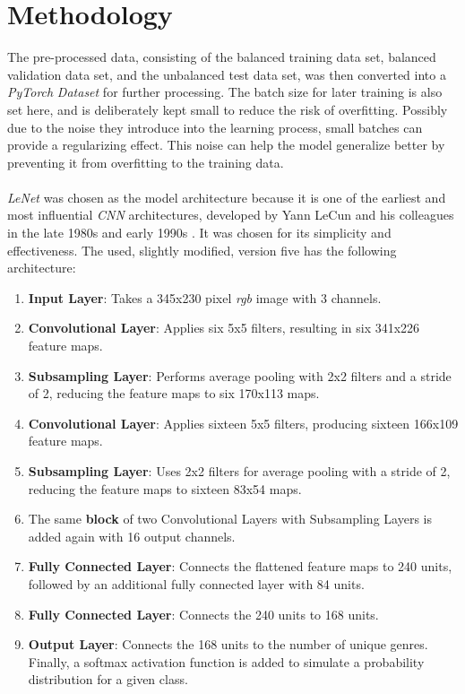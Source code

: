 \documentclass[a4paper, 11pt]{article}
\begin{document}
\section{Methodology}
    The pre-processed data, consisting of the balanced training data set, balanced validation data set, and the unbalanced test data set, was then converted into a \textit{PyTorch} \textit{Dataset} for further processing. The batch size for later training is also set here, and is deliberately kept small to reduce the risk of overfitting. Possibly due to the noise they introduce into the learning process, small batches can provide a regularizing effect. This noise can help the model generalize better by preventing it from overfitting to the training data.\\\\
    \textit{LeNet} was chosen as the model architecture because it is one of the earliest and most influential \textit{CNN} architectures, developed by Yann LeCun and his colleagues in the late 1980s and early 1990s \cite{726791}. It was chosen for its simplicity and effectiveness. The used, slightly modified, version five has the following architecture:
    \begin{enumerate}
        \item \textbf{Input Layer}: Takes a 345x230 pixel \textit{rgb} image with 3 channels.
        \item \textbf{Convolutional Layer}: Applies six 5x5 filters, resulting in six 341x226 feature maps.
        \item \textbf{Subsampling Layer}: Performs average pooling with 2x2 filters and a stride of 2, reducing the feature maps to six 170x113 maps.
        \item \textbf{Convolutional Layer}: Applies sixteen 5x5 filters, producing sixteen 166x109 feature maps. 
        \item \textbf{Subsampling Layer}: Uses 2x2 filters for average pooling with a stride of 2, reducing the feature maps to sixteen 83x54 maps.
        \item The same \textbf{block} of two Convolutional Layers with Subsampling Layers is added again with 16 output channels. 
        \item \textbf{Fully Connected Layer}: Connects the flattened feature maps to 240 units, followed by an additional fully connected layer with 84 units.
        \item \textbf{Fully Connected Layer}: Connects the 240 units to 168 units. 
        \item \textbf{Output Layer}: Connects the 168 units to the number of unique genres. Finally, a softmax activation function is added to simulate a probability distribution for a given class. 
    \end{enumerate}
\end{document}
